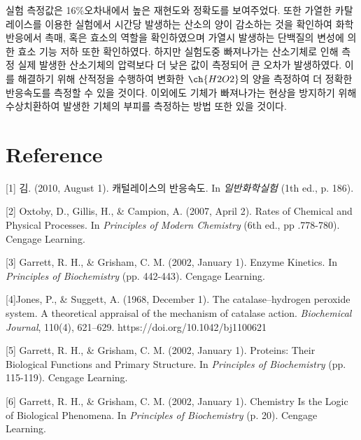 \documentclass[%
 reprint,
 amsmath,amssymb,
 aps,
]{revtex4-2}
\begin{document}
실험 측정값은 16\%오차내에서 높은 재현도와 정확도를 보여주었다. 또한 가열한 카탈레이스를 이용한 실험에서 시간당 발생하는 산소의 양이 감소하는 것을 확인하여 화학반응에서 촉매, 혹은 효소의 역할을 확인하였으며 가열시 발생하는 단백질의 변성에 의한 효소 기능 저하 또한 확인하였다. 하지만 실험도중 빠져나가는 산소기체로 인해 측정 실제 발생한 산소기체의 압력보다 더 낮은 값이 측정되어 큰 오차가 발생하였다. 이를 해결하기 위해 산적정을 수행하여 변화한 $\ch{H2O2}$의 양을 측정하여 더 정확한 반응속도를 측정할 수 있을 것이다. 이외에도 기체가 빠져나가는 현상을 방지하기 위해 수상치환하여 발생한 기체의 부피를 측정하는 방법 또한 있을 것이다.

\section{\label{sec:level1}Reference}
[1] 김. (2010, August 1). 캐털레이스의 반응속도. In \textit{일반화학실험} (1th ed., p. 186).

[2] Oxtoby, D., Gillis, H., \& Campion, A. (2007, April 2). Rates of Chemical and Physical Processes. In \textit{Principles of Modern Chemistry} (6th ed., pp .778-780). Cengage Learning.

[3] Garrett, R. H., \& Grisham, C. M. (2002, January 1). Enzyme Kinetics. In \textit{Principles of Biochemistry} (pp. 442-443). Cengage Learning.

[4]Jones, P., \& Suggett, A. (1968, December 1). The catalase–hydrogen peroxide system. A theoretical appraisal of the mechanism of catalase action. \textit{Biochemical Journal}, 110(4), 621–629. https://doi.org/10.1042/bj1100621

[5] Garrett, R. H., \& Grisham, C. M. (2002, January 1). Proteins: Their Biological Functions and Primary Structure. In \textit{Principles of Biochemistry} (pp. 115-119). Cengage Learning.

[6] Garrett, R. H., \& Grisham, C. M. (2002, January 1). Chemistry Is the Logic of Biological Phenomena. In \textit{Principles of Biochemistry} (p. 20). Cengage Learning.
\end{document}
